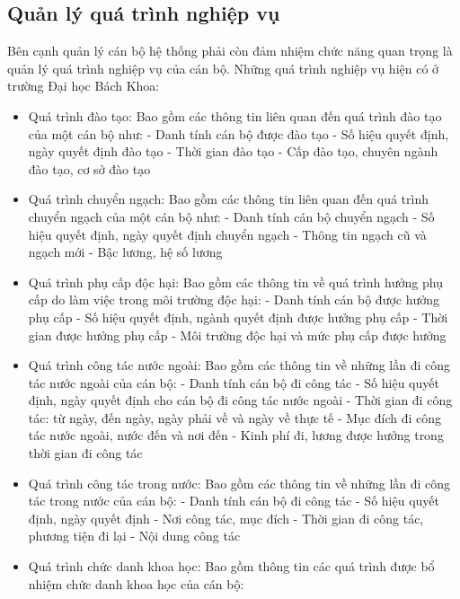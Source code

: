 \subsection{Quản lý quá trình nghiệp vụ}
Bên cạnh quản lý cán bộ hệ thống phải còn đảm nhiệm chức năng quan trọng là quản lý quá trình nghiệp vụ của cán bộ. Những quá trình nghiệp vụ hiện có ở trường Đại học Bách Khoa: 
\begin{itemize}
    \item Quá trình đào tạo: Bao gồm các thông tin liên quan đến quá trình đào tạo của một cán bộ như:
        \subitem - Danh tính cán bộ được đào tạo
        \subitem - Số hiệu quyết định, ngày quyết định đào tạo
        \subitem - Thời gian đào tạo
        \subitem - Cấp đào tạo, chuyên ngành đào tạo, cơ sở đào tạo
    \item Quá trình chuyển ngạch: Bao gồm các thông tin liên quan đến quá trình chuyển ngạch của một cán bộ như:
        \subitem - Danh tính cán bộ chuyển ngạch
        \subitem - Số hiệu quyết định, ngày quyết định chuyển ngạch
        \subitem - Thông tin ngạch cũ và ngạch mới
        \subitem - Bậc lương, hệ số lương
    \item Quá trình phụ cấp độc hại: Bao gồm các thông tin về quá trình hưởng phụ cấp do làm việc trong môi trường độc hại:
        \subitem - Danh tính cán bộ được hưởng phụ cấp
        \subitem - Số hiệu quyết định, ngành quyết định được hưởng phụ cấp
        \subitem - Thời gian được hưởng phụ cấp
        \subitem - Môi trường độc hại và mức phụ cấp được hưởng
    \item Quá trình công tác nước ngoài: Bao gồm các thông tin về những lần đi công tác nước ngoài của cán bộ:
        \subitem - Danh tính cán bộ đi công tác
        \subitem - Số hiệu quyết định, ngày quyết định cho cán bộ đi công tác nước ngoài
        \subitem - Thời gian đi công tác: từ ngày, đến ngày, ngày phải về và ngày về thực tế
        \subitem - Mục đích đi công tác nước ngoài, nước đến và nơi đến
        \subitem - Kinh phí đi, lương được hưởng trong thời gian đi công tác
    \item Quá trình công tác trong nước: Bao gồm các thông tin về những lần đi công tác trong nước của cán bộ:
        \subitem - Danh tính cán bộ đi công tác
        \subitem - Số hiệu quyết định, ngày quyết định
        \subitem - Nơi công tác, mục đích
        \subitem - Thời gian đi công tác, phương tiện đi lại
        \subitem - Nội dung công tác
    \item Quá trình chức danh khoa học: Bao gồm thông tin các quá trình được bổ nhiệm chức danh khoa học của cán bộ:

\end{itemize}

